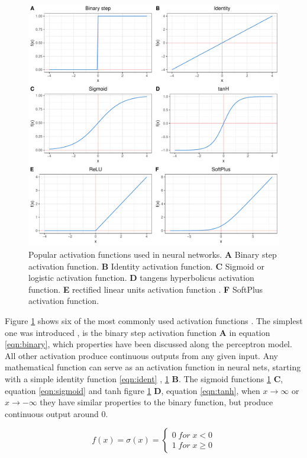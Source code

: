 \begin{figure}[H]
\centering
\includegraphics[height=.55\textheight, width=.85\textwidth]{Figures/activation}
\decoRule
\caption[Popular activation functions for neural networks]{Popular activation functions used in neural networks.
 \textbf{A} Binary step activation function.
 \textbf{B} Identity activation function.
 \textbf{C} Sigmoid or logistic activation function.
 \textbf{D} tangens hyperbolicus activation function.
 \textbf{E} rectified linear units activation function .
 \textbf{F} SoftPlus activation function.}
\label{fig:activation}
\end{figure}

Figure \ref{fig:activation} shows six of the most commonly used activation functions
\cite{warner1996understanding}. The simplest one was introduced , is the binary step activation function \textbf{A} in
equation \ref{eqn:binary}, which properties have been discussed along the perceptron model. All other
activation produce continuous outputs from any given input. Any mathematical function can serve as
an activation function in neural nets, starting with a simple identity function \ref{eqn:ident} ,
\ref{fig:activation} \textbf{B}.  The sigmoid functions \ref{fig:activation} \textbf{C}, equation \ref{eqn:sigmoid}
and tanh figure \ref{fig:activation} \textbf{D}, equation \ref{eqn:tanh}, when $x \rightarrow \infty$ or
$x \rightarrow -\infty$ they have similar properties to the binary function, but produce continuous output
around 0.

\begin{equation}
 f(x)= \sigma(x) = \left\{
 \begin{array}{ll}
  0 \; for \; x < 0 \\ 
  1 \; for \; x \geq 0
 \end{array}
\right .
\label{eqn:binary}
\end{equation}

